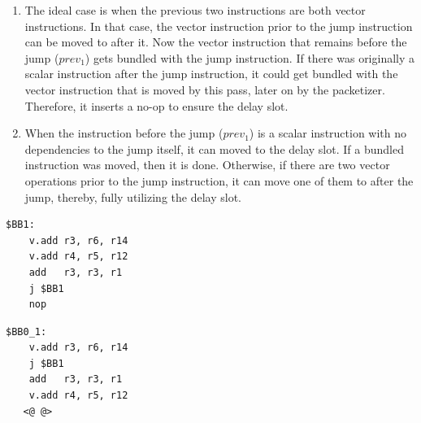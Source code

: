 \begin{enumerate}
\item The ideal case is when the previous two instructions are both vector instructions. In that case, the vector instruction prior to the jump instruction can be moved to after it. Now the vector instruction that remains before the jump ($prev_1$) gets bundled with the jump instruction. If there was originally a scalar instruction after the jump instruction, it could get bundled with the vector instruction that is moved by this pass, later on by the packetizer. Therefore, it inserts a no-op to ensure the delay slot. %
\item When the instruction before the jump ($prev_1$) is a scalar instruction with no dependencies to the jump itself, it can moved to the delay slot. If a bundled instruction was moved, then it is done. Otherwise, if there are two vector operations prior to the jump instruction, it can move one of them to after the jump, thereby, fully utilizing the delay slot.

\end{enumerate}

\label{lst:delayslot2}
\begin{center}
\hspace{2px}\begin{minipage}{.475\textwidth}
\begin{lstlisting}[frame=tlrb]
$BB1:
    v.add r3, r6, r14
    v.add r4, r5, r12
    add   r3, r3, r1
    j $BB1
    nop
\end{lstlisting}
\end{minipage}\hfill
\begin{minipage}{.475\textwidth}
\begin{lstlisting}[frame=tlrb]
$BB0_1:
    v.add r3, r6, r14
    j $BB1
    add   r3, r3, r1
    v.add r4, r5, r12
   <@ @>
\end{lstlisting}
\end{minipage}
\end{center}

